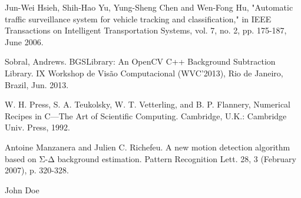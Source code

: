 \documentclass[conference]{IEEEtran}
\begin{document}

%
%
%
\begin{thebibliography}{1}

Jun-Wei Hsieh, Shih-Hao Yu, Yung-Sheng Chen and Wen-Fong Hu, "Automatic traffic surveillance system for vehicle tracking and classification," in IEEE Transactions on Intelligent Transportation Systems, vol. 7, no. 2, pp. 175-187, June 2006.

Sobral, Andrews. BGSLibrary: An OpenCV C++ Background Subtraction Library. IX Workshop de Visão Computacional (WVC'2013), Rio de Janeiro, Brazil, Jun. 2013.

W. H. Press, S. A. Teukolsky, W. T. Vetterling, and B. P. Flannery, Numerical Recipes in C—The Art of Scientific Computing. Cambridge, U.K.: Cambridge Univ. Press, 1992.

Antoine Manzanera and Julien C. Richefeu. A new motion detection algorithm based on Σ-Δ background estimation. Pattern Recognition Lett. 28, 3 (February 2007), p. 320-328.
\end{thebibliography}

% 

\begin{IEEEbiography}{John Doe}
\blindtext
\end{IEEEbiography}


\vfill

\enlargethispage{-5in}
\end{document}
